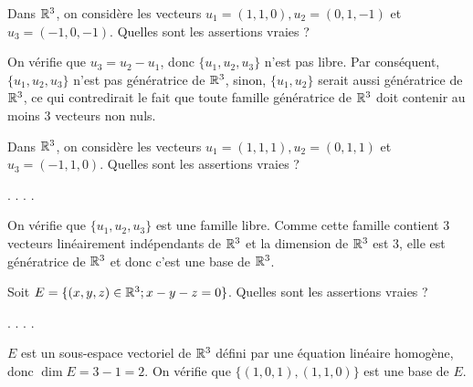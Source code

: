 \begin{question}
Dans $\mathbb{R}^3$, on considère les vecteurs $u_1=(1,1,0), u_2=(0,1,-1)$ et $ u_3=(-1,0,-1)$. Quelles sont les assertions vraies ?
\begin{answers}  
\end{answers}
\begin{explanations} On vérifie que $u_3= u_2-u_1$, donc $\{u_1,u_2,u_3\}$ n'est pas libre. Par conséquent, $\{u_1,u_2,u_3\}$ 
n'est pas génératrice de $\mathbb{R}^3$, sinon, $\{u_1,u_2\}$ serait aussi génératrice de $\mathbb{R}^3$, ce qui contredirait 
le fait que toute famille génératrice de $\mathbb{R}^3$ doit contenir au moins $3$ vecteurs non nuls.
\end{explanations}
\end{question}

\begin{question}
Dans $\mathbb{R}^3$, on considère les vecteurs $u_1=(1,1,1), u_2=(0,1,1)$ et $ u_3=(-1,1,0)$. 
Quelles sont les assertions vraies ?
\begin{answers}  
.
.
.
.
\end{answers}
\begin{explanations} On vérifie que $\{u_1,u_2,u_3\}$ est une famille libre. Comme cette famille contient $3$  vecteurs 
linéairement indépendants de $\mathbb{R}^3$ et la dimension de $\mathbb{R}^3$ est $3$, elle est génératrice de   $\mathbb{R}^3$ et donc c'est une base de $\mathbb{R}^3$.
\end{explanations}
\end{question}

\begin{question}
Soit $E=\{(x,y,z) \in \mathbb{R}^3 ; x-y-z=0\}$. Quelles sont les assertions vraies ?
\begin{answers}  
.
.
.
.
\end{answers}
\begin{explanations} $E$ est un sous-espace vectoriel de $\mathbb{R}^3$ défini par une équation linéaire homogène, donc $\dim E=3-1=2$. On vérifie que $\{(1,0,1),(1,1,0)\}$ est une base de $E$.
\end{explanations}
\end{question}


